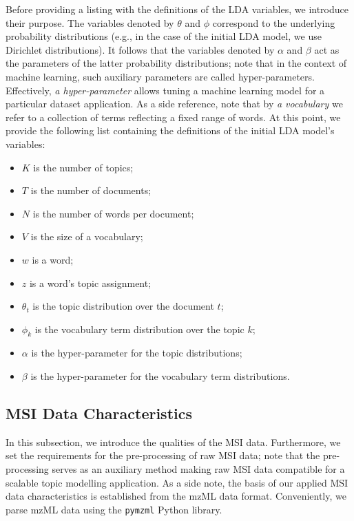 \documentclass{mpaper}
\begin{document}
\par Before providing a listing with the definitions of the LDA variables, we introduce their purpose. The variables denoted by $\theta$ and $\phi$ correspond to the underlying probability distributions (e.g., in the case of the initial LDA model, we use Dirichlet distributions). It follows that the variables denoted by $\alpha$ and $\beta$ act as the parameters of the latter probability distributions; note that in the context of machine learning, such auxiliary parameters are called hyper-parameters. Effectively, \textit{a hyper-parameter} allows tuning a machine learning model for a particular dataset application. As a side reference, note that by \textit{a vocabulary} we refer to a collection of terms reflecting a fixed range of words. At this point, we provide the following list containing the definitions of the initial LDA model's variables: 
\begin{itemize}
	\item $K$ is the number of topics;
	\item $T$ is the number of documents;
	\item $N$ is the number of words per document;
	\item $V$ is the size of a vocabulary;
	\item $w$ is a word;
	\item $z$ is a word's topic assignment;
	\item $\theta_t$ is the topic distribution over the document $t$;
	\item $\phi_k$ is the vocabulary term distribution over the topic $k$;
	\item $\alpha$ is the hyper-parameter for the topic distributions;
	\item $\beta$ is the hyper-parameter for the vocabulary term distributions.
\end{itemize}

\subsection{MSI Data Characteristics}

\par In this subsection, we introduce the qualities of the MSI data. Furthermore, we set the requirements for the pre-processing of raw MSI data; note that the pre-processing serves as an auxiliary method making raw MSI data compatible for a scalable topic modelling application. As a side note, the basis of our applied MSI data characteristics is established from the mzML data format. Conveniently, we parse mzML data using the \texttt{pymzml} Python library. 
\end{document}
